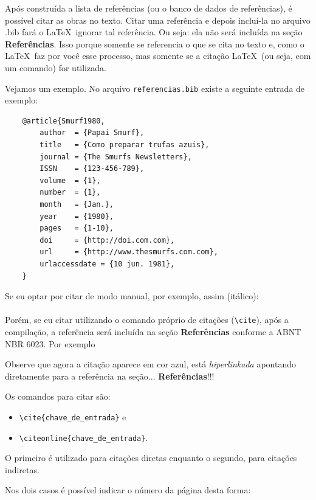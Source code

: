 {Após construída a lista de referências (ou o banco de dados de referências), é possível citar as obras no texto. Citar  uma referência e depois incluí-la no arquivo .bib fará o \LaTeX\ ignorar tal referência. Ou seja: ela não será incluída na seção \textbf{Referências}. Isso porque somente se referencia o que se cita no texto e, como o \LaTeX\ faz por você esse processo, mas somente se a citação \LaTeX\ (ou seja, com um comando) for utilizada.

Vejamos um exemplo. No arquivo \verb|referencias.bib| existe a seguinte entrada de exemplo:

\begin{verbatim}
	@article{Smurf1980,
		author  = {Papai Smurf},
		title   = {Como preparar trufas azuis},
		journal = {The Smurfs Newsletters},
		ISSN    = {123-456-789},
		volume  = {1},
		number  = {1},
		month   = {Jan.},
		year    = {1980},
		pages   = {1-10},
		doi     = {http://doi.com.com},
		url     = {http://www.thesmurfs.com.com},
		urlaccessdate = {10 jun. 1981},
	}
\end{verbatim}

Se eu optar por citar de modo manual, por exemplo, assim (itálico): 
\ \\

\ \\

Porém, se eu citar utilizando o comando próprio de citações (\verb|\cite|), após a compilação, a referência será incluída na seção \textbf{Referências} conforme a ABNT NBR 6023. Por exemplo


Observe que agora a citação aparece em cor azul, está \textit{hiperlinkada} apontando diretamente para a referência na seção... \textbf{Referências}!!!

Os comandos para citar são: 
\begin{itemize}
	\item \verb|\cite{chave_de_entrada}| e 
	\item \verb|\citeonline{chave_de_entrada}|. 
\end{itemize}

O primeiro é utilizado para citações diretas enquanto o segundo, para citações indiretas.

Nos dois casos é possível indicar o número da página desta forma:
\ \\

}
